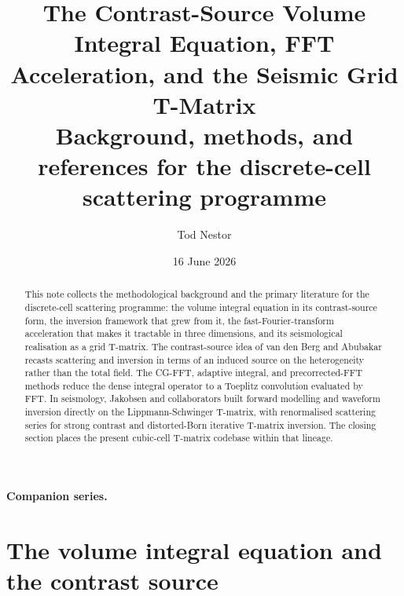 \documentclass[11pt,a4paper]{article}
\title{\bfseries The Contrast-Source Volume Integral Equation,
FFT Acceleration, and the Seismic Grid T-Matrix\\[4pt]
\large Background, methods, and references for the discrete-cell scattering programme}
\author{Tod Nestor}
\date{16 June 2026}
\begin{document}
\maketitle

\begin{abstract}
This note collects the methodological background and the primary literature for the
discrete-cell scattering programme: the volume integral equation in its contrast-source form,
the inversion framework that grew from it, the fast-Fourier-transform acceleration that makes
it tractable in three dimensions, and its seismological realisation as a grid T-matrix. The
contrast-source idea of van den Berg and Abubakar recasts scattering and inversion in terms of
an induced source on the heterogeneity rather than the total field. The CG-FFT, adaptive
integral, and precorrected-FFT methods reduce the dense integral operator to a Toeplitz
convolution evaluated by FFT. In seismology, Jakobsen and collaborators built forward
modelling and waveform inversion directly on the Lippmann-Schwinger T-matrix, with
renormalised scattering series for strong contrast and distorted-Born iterative T-matrix
inversion. The closing section places the present cubic-cell T-matrix codebase within that
lineage.
\end{abstract}

\bigskip
\noindent\textbf{Companion series.}

\tableofcontents
\bigskip

\section{The volume integral equation and the contrast source}
\end{document}
